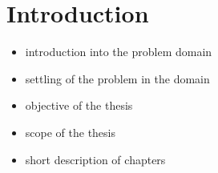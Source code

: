 \documentclass[a4paper,twoside,12pt]{book}
\newcounter{PagesWithoutNumbers}
\begin{document}
\vfill
 
 

\cleardoublepage


\pagestyle{onlyPageNumbers}
\tableofcontents

\setcounter{PagesWithoutNumbers}{\value{page}}
\mainmatter
\pagestyle{PageNumbersChapterTitles}



\chapter{Introduction}

\begin{itemize}
\item introduction into the problem domain
\item settling of the problem in the domain
\item objective of the thesis 
\item scope of the thesis
\item short description of chapters
\end{itemize}


\clearpage
\end{document}
